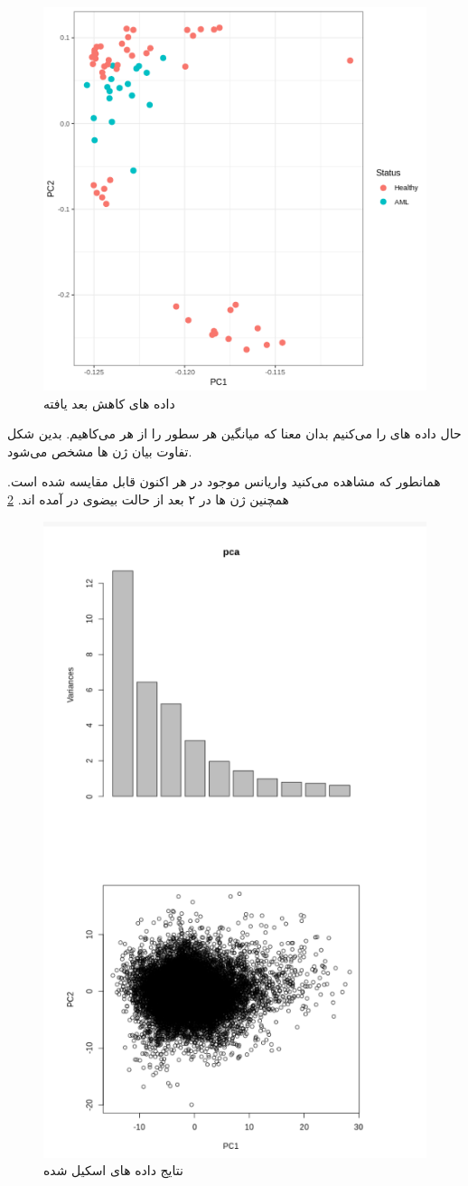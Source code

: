 \documentclass{article}
\begin{document}
\begin{figure}[h!]
	\centering
	\includegraphics[width=0.5\columnwidth]{figs/pca4.png}
	\caption{داده های کاهش بعد یافته}
	\label{fig:pca4}
\end{figure}

حال داده های را  می‌کنیم بدان معنا که  میانگین هر سطور را از هر می‌کاهیم. بدین شکل تفاوت بیان ژن ها مشخص می‌شود.

همانطور که مشاهده می‌کنید واریانس موجود در هر  اکنون قابل مقایسه شده است.
همچنین ژن ها در ۲ بعد از حالت بیضوی در آمده اند.
\ref{fig:pca5}
\begin{figure}[h!]
	\centering
	\includegraphics[width=0.5\columnwidth]{figs/pca5.png}
	\caption{ نتایج داده های اسکیل شده}
	\label{fig:pca5}
\end{figure}
\end{document}
